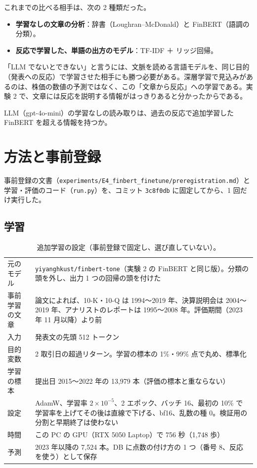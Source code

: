 \documentclass[xelatex,ja=standard,jafont=haranoaji,a4paper,10pt,openany]{bxjsreport}
\newcommand{\code}[1]{\texttt{#1}}
\begin{document}
これまでの比べる相手は、次の 2 種類だった。
\begin{itemize}
\item \textbf{学習なしの文章の分析}：辞書（Loughran--McDonald）と FinBERT（語調の分類）。
\item \textbf{反応で学習した、単語の出方のモデル}：TF-IDF ＋ リッジ回帰。
\end{itemize}

「LLM でないとできない」と言うには、文脈を読める言語モデルを、同じ目的（発表への反応）で学習させた相手にも勝つ必要がある。深層学習で見込みがあるのは、株価の数値の予測ではなく、この「文章から反応」への学習である。実験 2 で、文章には反応を説明する情報がはっきりあると分かったからである。

\begin{verdict}[問い]
LLM（gpt-4o-mini）の学習なしの読み取りは、過去の反応で追加学習した FinBERT を超える情報を持つか。
\end{verdict}

\chapter{方法と事前登録}\label{ch:method}

事前登録の文書（\code{experiments/E4\_finbert\_finetune/preregistration.md}）と学習・評価のコード（\code{run.py}）を、コミット \code{3c8f0db} に固定してから、1 回だけ実行した。

\section{学習}

\begin{table}[H]
\centering
\caption{追加学習の設定（事前登録で固定し、選び直していない）。}
\small
\begin{tabular}{lp{10.4cm}}
\toprule
元のモデル & \code{yiyanghkust/finbert-tone}（実験 2 の FinBERT と同じ版）。分類の頭を外し、出力 1 つの回帰の頭を付けた \\
事前学習の文章 & 論文によれば、10-K・10-Q は 1994〜2019 年、決算説明会は 2004〜2019 年、アナリストのレポートは 1995〜2008 年。評価期間（2023 年 11 月以降）より前 \\
入力 & 発表文の先頭 512 トークン \\
目的変数 & 2 取引日の超過リターン。学習の標本の 1\%・99\% 点で丸め、標準化 \\
学習の標本 & 提出日 2015〜2022 年の 13,979 本（評価の標本と重ならない） \\
設定 & AdamW、学習率 $2\times10^{-5}$、2 エポック、バッチ 16、最初の 10\% で学習率を上げてその後は直線で下げる、bf16、乱数の種 0。検証用の分割と早期終了は使わない \\
時間 & この PC の GPU（RTX 5050 Laptop）で 756 秒（1,748 歩） \\
予測 & 2023 年以降の 7,524 本。DB に点数の付け方の 1 つ（番号 8、反応を使う）として保存 \\
\bottomrule
\end{tabular}
\end{table}
\end{document}
